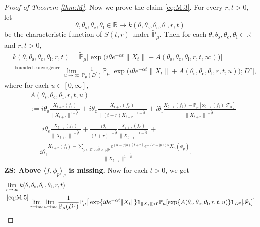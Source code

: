 \documentclass[12pt,a4paper]{amsart}
\theoremstyle{plain}
\theoremstyle{definition}
\numberwithin{equation}{section}
\begin{document}
\begin{proof}[Proof of Theorem \ref{thm:M}]
	Now we prove the claim \eqref{eq:M.3}.
	For every $r,t >0$, let
\[
	\theta,\theta_\mathrm s,\theta_\mathrm c,\theta_\mathrm l \in \mathbb R
	\mapsto k(\theta,\theta_\mathrm s,\theta_\mathrm c,\theta_\mathrm l,r,t)
\]
	be the characteristic function of  $S(t,r)$ under $\widetilde{\mathbb P}_{\mu}$.
	Then for each $\theta,\theta_\mathrm s,\theta_\mathrm c,\theta_\mathrm l\in \mathbb R$ and $r,t> 0$,
\begin{align}
	&k(\theta,\theta_\mathrm s,\theta_\mathrm c,\theta_\mathrm l,r,t)
	=\widetilde{\mathbb P}_{\mu}\big[\exp\big( i\theta e^{-\alpha t}\|X_t\|+A(\theta_\mathrm s,\theta_\mathrm c,\theta_\mathrm l,r,t,\infty)\big)\big]\\
	&\label{eq:M.5}\overset{\text{bounded convergence}}=\lim_{u\rightarrow \infty}\frac{1}{\mathbb P_{\mu}(D^c)}\mathbb P_{\mu}\big[\exp\big( i\theta e^{-\alpha t}\|X_t\|+A(\theta_\mathrm s,\theta_\mathrm c,\theta_\mathrm l,r,t,u)\big);D^c\big],
\end{align}
	where for each $u\in [0,\infty]$,
\begin{align}
	&A(\theta_\mathrm s,\theta_\mathrm c,\theta_\mathrm l,r,t,u)
	\\&:=i\theta_\mathrm s \frac{X_{t+r}(f_\mathrm s)}{\|X_{t+r}\|^{1-\tilde{\beta}}} + i\theta_\mathrm c \frac{X_{t+r}(f_\mathrm c)}{\|(t+r)X_{t+r}\|^{1-\tilde{\beta}}} + i\theta_\mathrm l  \frac{ X_{t+r}(f_\mathrm l)- \mathbb P_\mu[\mathrm x_{t+r}(f_\mathrm l)|\mathscr F_u]}{\|X_{t+r}\|^{1-\tilde{\beta}}}
	\\&\label{eq:M.6}
\begin{multlined}
	=i\theta_\mathrm s \frac{X_{t+r}(f_\mathrm s)}{\|X_{t+r}\|^{1-\tilde{\beta}}} + \frac{i\theta_\mathrm c}{(t+r)^{1-\tilde{\beta}}} \frac{X_{t+r}(f_\mathrm c)}{\|X_{t+r}\|^{1-\tilde{\beta}}} + {}
	\\\quad  i\theta_\mathrm l  \frac{ X_{t+r}(f_\mathrm l) - \sum_{p\in \mathbb Z_+^d:\alpha\tilde{\beta}>|p|b} e^{(\alpha - |p|b)(t+r)} e^{-(\alpha - |p|b)u}X_u(\phi_p) }{\|X_{t+r}\|^{1-\tilde{\beta}}}.
\end{multlined}
\end{align}
{\bf ZS: Above $\langle f, \phi_p\rangle_\varphi$ is missing.}
	Now for each $t>0$, we get
\begin{align}
	& \lim_{r\to \infty}k(\theta,\theta_\mathrm s,\theta_\mathrm c,\theta_\mathrm l,r,t)
	\\&\overset{\eqref{eq:M.5}}=\lim_{r\to \infty}\lim_{u\rightarrow \infty}\frac{1}{\mathbb P_{\mu}(D^c)}\mathbb P_{\mu}\big[\exp\{i\theta e^{-\alpha t}\|X_t\|\} \mathbf 1_{\|X_t\|>0} \mathbb P_{\mu}[\exp\{A(\theta_\mathrm s,\theta_\mathrm c,\theta_\mathrm l,r,t,u)\}\mathbf 1_{D^c}|\mathscr F_t]\big]

\end{align}
\end{proof}
\end{document}
